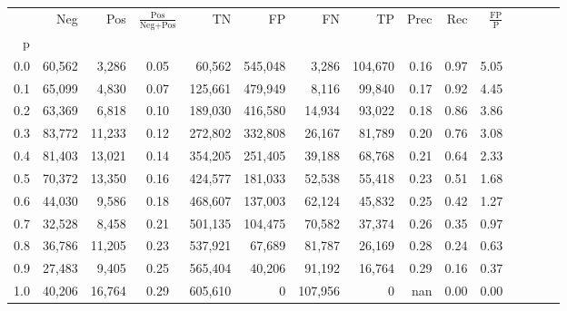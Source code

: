 \begin{tabular}{rrrcrrrrrrrrrrr}
\toprule
{} &     Neg &     Pos & $\frac{\text{Pos}}{\text{Neg}+\text{Pos}}$ &       TN &       FP &       FN &       TP &  Prec &   Rec & $\frac{\text{FP}}{\text{P}}$ \\
p   &         &         &                                            &          &          &          &          &       &       &                              \\
\midrule
0.0 &  60,562 &   3,286 &                                       0.05 &   60,562 &  545,048 &    3,286 &  104,670 &  0.16 &  0.97 &                         5.05 \\
0.1 &  65,099 &   4,830 &                                       0.07 &  125,661 &  479,949 &    8,116 &   99,840 &  0.17 &  0.92 &                         4.45 \\
0.2 &  63,369 &   6,818 &                                       0.10 &  189,030 &  416,580 &   14,934 &   93,022 &  0.18 &  0.86 &                         3.86 \\
0.3 &  83,772 &  11,233 &                                       0.12 &  272,802 &  332,808 &   26,167 &   81,789 &  0.20 &  0.76 &                         3.08 \\
0.4 &  81,403 &  13,021 &                                       0.14 &  354,205 &  251,405 &   39,188 &   68,768 &  0.21 &  0.64 &                         2.33 \\
0.5 &  70,372 &  13,350 &                                       0.16 &  424,577 &  181,033 &   52,538 &   55,418 &  0.23 &  0.51 &                         1.68 \\
0.6 &  44,030 &   9,586 &                                       0.18 &  468,607 &  137,003 &   62,124 &   45,832 &  0.25 &  0.42 &                         1.27 \\
0.7 &  32,528 &   8,458 &                                       0.21 &  501,135 &  104,475 &   70,582 &   37,374 &  0.26 &  0.35 &                         0.97 \\
0.8 &  36,786 &  11,205 &                                       0.23 &  537,921 &   67,689 &   81,787 &   26,169 &  0.28 &  0.24 &                         0.63 \\
0.9 &  27,483 &   9,405 &                                       0.25 &  565,404 &   40,206 &   91,192 &   16,764 &  0.29 &  0.16 &                         0.37 \\
1.0 &  40,206 &  16,764 &                                       0.29 &  605,610 &        0 &  107,956 &        0 &   nan &  0.00 &                         0.00 \\
\bottomrule
\end{tabular}
